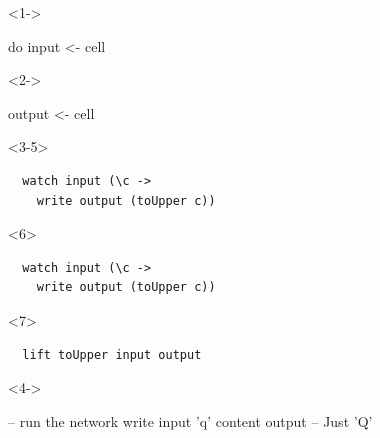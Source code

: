 \documentclass[UKenglish,usenames,dvipsnames,svgnames,table,aspectratio=169,mathserif]{beamer}
\newcommand{\nl}{\vspace{\baselineskip}}
\begin{document}
\begin{frame}[fragile]
\begin{columns}
\begin{column}{0.5\textwidth}
\begin{overlayarea}{\textwidth}{0.3\textheight}
\begin{onlyenv}<1->
\begin{haskellcode}
do
  input  <- cell
\end{haskellcode}
\end{onlyenv}
\begin{onlyenv}<2->
\begin{haskellcode}
  output <- cell
\end{haskellcode}
\end{onlyenv}
\begin{onlyenv}<3-5>
\begin{verbatim}
  watch input (\c ->
    write output (toUpper c))
\end{verbatim}
\end{onlyenv}
\begin{onlyenv}<6>
\begin{verbatim}
  watch input (\c ->
    write output (toUpper c))
\end{verbatim}
\end{onlyenv}
\begin{onlyenv}<7>
\begin{verbatim}
  lift toUpper input output
\end{verbatim}
\end{onlyenv}
\end{overlayarea}
\begin{overlayarea}{\textwidth}{0.2\textheight}
\begin{onlyenv}<4->
\begin{haskellcode}
  -- run the network
  write input 'q'
  content output   -- Just 'Q'
\end{haskellcode}
\end{onlyenv}
\end{overlayarea}
\end{column}
\end{columns}
\end{frame}
\end{document}
